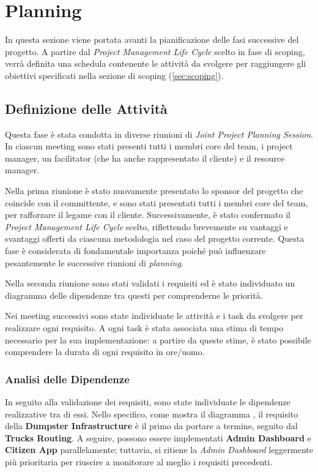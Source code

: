 \usepackage{eurosym}\section{Planning}
\label{sec:planning}

In questa sezione viene portata avanti la pianificazione delle fasi successive del progetto. A partire dal \textit{Project Management Life Cycle} scelto in fase di scoping, verrà definita una schedula contenente le attività da svolgere per raggiungere gli obiettivi specificati nella sezione di scoping (\ref{sec:scoping}).

\subsection{Definizione delle Attività}
Questa fase è stata condotta in diverse riunioni di \textit{Joint Project Planning Session}. In ciascun meeting sono stati presenti tutti i membri core del team, i project manager, un facilitator (che ha anche rappresentato il cliente) e il resource manager.

Nella prima riunione è stato nuovamente presentato lo sponsor del progetto che coincide con il committente, e sono stati presentati tutti i membri core del team, per rafforzare il legame con il cliente. Successivamente, è stato confermato il \textit{Project Management Life Cycle} scelto, riflettendo brevemente su vantaggi e svantaggi offerti da ciascuna metodologia nel caso del progetto corrente. Questa fase è considerata di fondamentale importanza poiché può influenzare pesantemente le successive riunioni di \textit{planning}.

Nella seconda riunione sono stati validati i requisiti ed è stato individuato un diagramma delle dipendenze tra questi per comprenderne le priorità.

Nei meeting successivi sono state individuate le attività e i task da svolgere per realizzare ogni requisito. A ogni task è stata associata una stima di tempo necessario per la sua implementazione: a partire da queste stime, è stato possibile comprendere la durata di ogni requisito in ore/uomo.

\subsubsection{Analisi delle Dipendenze}
In seguito alla validazione dei requisiti, sono state individuate le dipendenze realizzative tra di essi. Nello specifico, come mostra il diagramma , il requisito della \textbf{Dumpster Infrastructure} è il primo da portare a termine, seguito dal \textbf{Trucks Routing}. A seguire, possono essere implementati \textbf{Admin Dashboard} e \textbf{Citizen App} parallelamente; tuttavia, si ritiene la \textit{Admin Dashboard} leggermente più prioritaria per riuscire a monitorare al meglio i requisiti precedenti.

